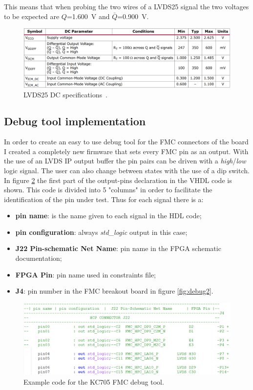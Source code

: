 This means that when probing the two wires of a LVDS25 signal the two voltages to be expected are $Q$=1.600~V and $\bar{Q}$=0.900~V.
\begin{figure}[H]
	\centering
	\includegraphics[width=0.8\linewidth]{IMG/ch3/LVDS25SPEC}
	\caption{LVDS25 DC specifications~\cite{lvds2}.}
	\label{fig:lvds25}
\end{figure}
\subsection{Debug tool implementation}
In order to create an easy to use debug tool for the FMC connectors of the board I created a completely new firmware that sets every FMC pin as an output.
With the use of an LVDS IP output buffer the pin pairs can be driven with a \textit{high}/\textit{low} logic signal.
The user can also change between states with the use of a dip switch.
In figure \ref{fig:debug1} the first part of the output-pins declaration in the VHDL code is shown.
This code is divided into 5 "columns" in order to facilitate the identification of the pin under test.
Thus for each signal there is a:
\begin{itemize}
	\item \textbf{pin name}: is the name given to each signal in the HDL code;
	\item \textbf{pin configuration}: always \textit{std\_logic} output in this case;
	\item \textbf{J22 Pin-schematic Net Name}: pin name in the FPGA schematic documentation; 
	\item \textbf{FPGA Pin}: pin name used in constraints file; 
	\item \textbf{J4}: pin number in the FMC breakout board in figure \ref{fig:debug2}. 
\end{itemize}     
\begin{figure}[H]
	\centering
	\includegraphics[width=0.8\linewidth]{IMG/ch3/DEBUG1}
	\caption{Example code for the KC705 FMC debug tool.}
	\label{fig:debug1}
\end{figure}
